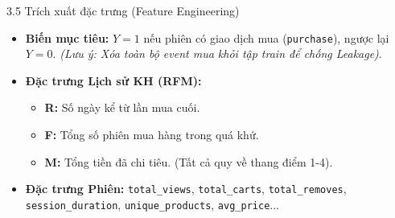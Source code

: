 \documentclass[aspectratio=169, 11pt]{beamer}
\begin{document}
\begin{frame}{3.5 Trích xuất đặc trưng (Feature Engineering)}
    \begin{itemize}
        \item \textbf{Biến mục tiêu:} $Y = 1$ nếu phiên có giao dịch mua (\texttt{purchase}), ngược lại $Y = 0$. \textit{(Lưu ý: Xóa toàn bộ event mua khỏi tập train để chống Leakage)}.
        \vspace{0.2cm}
        \item \textbf{Đặc trưng Lịch sử KH (RFM):} 
        \begin{itemize}
            \item \textbf{R:} Số ngày kể từ lần mua cuối.
            \item \textbf{F:} Tổng số phiên mua hàng trong quá khứ.
            \item \textbf{M:} Tổng tiền đã chi tiêu. (Tất cả quy về thang điểm 1-4).
        \end{itemize}
        \vspace{0.2cm}
        \item \textbf{Đặc trưng Phiên:} \texttt{total\_views}, \texttt{total\_carts}, \texttt{total\_removes}, \texttt{session\_duration}, \texttt{unique\_products}, \texttt{avg\_price}...
    \end{itemize}
\end{frame}
\end{document}
